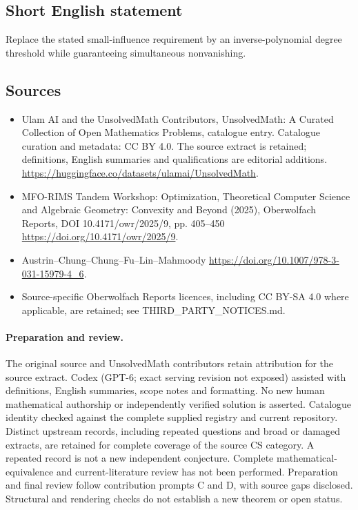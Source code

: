 \documentclass[11pt]{article}
\begin{document}
\subsection{Short English statement}
Replace the stated small-influence requirement by an inverse-polynomial degree threshold while guaranteeing simultaneous nonvanishing.
\subsection{Sources}
\begin{itemize}
\item[\hypertarget{source:statement:1}{S1}] Ulam AI and the UnsolvedMath Contributors, UnsolvedMath: A Curated Collection of Open Mathematics Problems, catalogue entry. Catalogue curation and metadata: CC BY 4.0. The source extract is retained; definitions, English summaries and qualifications are editorial additions.
\url{https://huggingface.co/datasets/ulamai/UnsolvedMath}.
\item[\hypertarget{source:statement:2}{S2}] MFO-RIMS Tandem Workshop: Optimization, Theoretical Computer Science and Algebraic Geometry: Convexity and Beyond (2025), Oberwolfach Reports, DOI 10.4171/owr/2025/9, pp. 405--450
\url{https://doi.org/10.4171/owr/2025/9}.
\item[\hypertarget{source:statement:3}{S3}] Austrin--Chung--Chung--Fu--Lin--Mahmoody
\url{https://doi.org/10.1007/978-3-031-15979-4_6}.
\item Source-specific Oberwolfach Reports licences, including CC BY-SA 4.0 where applicable, are retained; see THIRD\_PARTY\_NOTICES.md.
\end{itemize}
\paragraph{Preparation and review.}
The original source and UnsolvedMath contributors retain attribution for the source extract. Codex (GPT-6; exact serving revision not exposed) assisted with definitions, English summaries, scope notes and formatting. No new human mathematical authorship or independently verified solution is asserted. Catalogue identity checked against the complete supplied registry and current repository. Distinct upstream records, including repeated questions and broad or damaged extracts, are retained for complete coverage of the source CS category. A repeated record is not a new independent conjecture. Complete mathematical-equivalence and current-literature review has not been performed. Preparation and final review follow contribution prompts C and D, with source gaps disclosed. Structural and rendering checks do not establish a new theorem or open status.
\label{end:statement}
\end{document}
